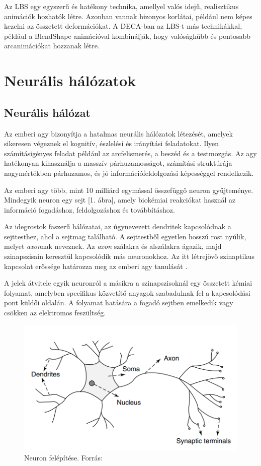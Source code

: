 \documentclass[12pt,a4]{article}
\begin{document}
Az LBS egy egyszerű és hatékony technika, amellyel valós idejű, realisztikus animációk hozhatók létre. 
Azonban vannak bizonyos korlátai, például nem képes kezelni az összetett deformációkat. 
A DECA-ban az LBS-t más technikákkal, például a BlendShape animációval kombinálják, hogy valósághűbb és pontosabb arcanimációkat hozzanak létre.

 
	\section{Neurális hálózatok}
	\subsection{Neurális hálózat}
	\label{NN}
	Az emberi agy bizonyítja a hatalmas neurális hálózatok \cite{ann} létezését, amelyek sikeresen végeznek el kognitív, észlelési és irányítási feladatokat. Ilyen számításigényes feladat például az arcfelismerés, a beszéd és a testmozgás. Az agy hatékonyan kihasználja a masszív párhuzamosságot, számítási struktúrája nagymértékben párhuzamos, és jó információfeldolgozási képességgel rendelkezik.
	
	Az emberi agy több, mint 10 milliárd egymással összefüggő neuron gyűjteménye. Mindegyik neuron egy sejt [1. ábra], amely biokémiai reakciókat használ az információ fogadáshoz, feldolgozáshoz és továbbításhoz.
	
	Az idegrostok faszerű hálózatai, az úgynevezett dendritek kapcsolódnak a sejttesthez, ahol a sejtmag található. A sejttestből egyetlen hosszú rost nyúlik, melyet \textit{axon}nak neveznek. Az \textit{axon} szálakra és alszálakra ágazik, majd szinapszisain keresztül kapcsolódik más neuronokhoz. Az itt létrejövő szinaptikus kapcsolat erőssége határozza meg az emberi agy tanulását\cite{ann} .
	
	A jelek átvitele egyik neuronról a másikra a szinapszisoknál egy összetett kémiai folyamat, amelyben specifikus közvetítő anyagok szabadulnak fel a kapcsolódási pont küldői oldalán. A folyamat hatására a fogadó sejtben emelkedik vagy csökken az elektromos feszültség\cite{ann}.
	\begin{figure}[h]	
		\centering
		\includegraphics[width=1\linewidth]{neuron1}
		\caption{Neuron felépítése. 
			Forrás:\cite{ann}}
	\end{figure}
	\newpage
\end{document}
